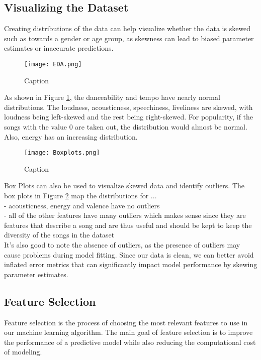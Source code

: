 \documentclass{article}
\begin{document}
\subsection{Visualizing the Dataset}
Creating distributions of the data can help visualize whether the data is skewed such as towards a gender or age group, as skewness can lead to biased parameter estimates or inaccurate predictions.
\begin{figure}[H]
    \centering
    \begin{minipage}{1\textwidth}
        \texttt{[image: EDA.png]}
        \caption{Caption}
        \label{graph:EDA}
    \end{minipage}%
\end{figure}
As shown in Figure \ref{graph:EDA}, the danceability and tempo have nearly normal distributions. The loudness, acousticness, speechiness, liveliness are skewed, with loudness being left-skewed and the rest being right-skewed. For popularity, if the songs with the value 0 are taken out, the distribution would almost be normal. Also, energy has an increasing distribution.

\begin{figure}[H]
    \centering
    \begin{minipage}{1\textwidth}
        \texttt{[image: Boxplots.png]}
        \caption{Caption}
        \label{Boxplots}
    \end{minipage}%
\end{figure}
Box Plots can also be used to visualize skewed data and identify outliers.
The box plots in Figure \ref{Boxplots} map the distributions for ...\\
- acousticness, energy and valence have no outliers\\
- all of the other features have many outliers which makes sense since they are features that describe a song and are thus useful and should be kept to keep the diversity of the songs in the dataset\\
It's also good to note the absence of outliers, as the presence of outliers may cause problems during model fitting. Since our data is clean, we can better avoid inflated error metrics that can significantly impact model performance by skewing parameter estimates.

\subsection{Feature Selection} Feature selection is the process of choosing the most relevant features to use in our machine learning algorithm. The main goal of feature selection is to improve the performance of a predictive model while also reducing the computational cost of modeling.\\
\end{document}
